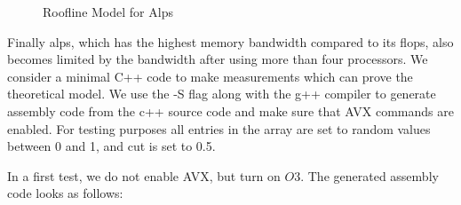 \documentclass[]{article}
\begin{document}
\begin{figure}
	[H]
	\begin{center}
	\end{center}
	\caption{Roofline Model for Alps}
	\label{fig:roofalps}
\end{figure}

Finally alps, which has the highest memory bandwidth compared to its flops, also becomes limited by the bandwidth after using more than four processors.
We consider a minimal C++ code to make measurements which can prove the theoretical model. We use the -S flag along with the g++ compiler to generate assembly code from the c++ source code and make sure that AVX commands are enabled. For testing purposes all entries in the array are set to random values between 0 and 1, and cut is set to 0.5.

In a first test, we do not enable AVX, but turn on $O3$. The generated assembly code looks as follows:
\end{document}
